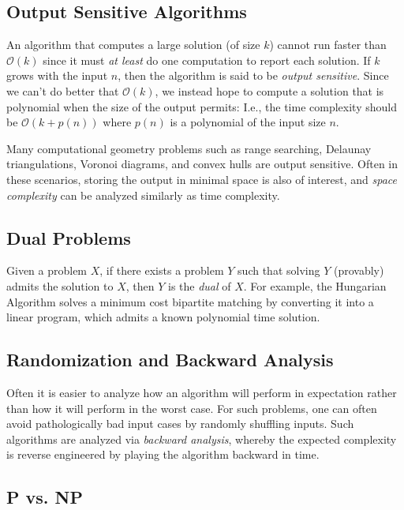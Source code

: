 \documentclass[12pt]{article}
\begin{document}
\subsection*{Output Sensitive Algorithms}

An algorithm that computes a large solution (of size $k$) cannot run faster
than $\mathcal{O}(k)$ since it must {\it at least} do one computation to
report each solution.
If $k$ grows with the input $n$, then the algorithm is said to be 
{\it output sensitive}.
Since we can't do better that $\mathcal{O}(k)$, we instead hope to compute
a solution that is polynomial when the size of the output permits: 
I.e., the time complexity should be $\mathcal{O}\left(k + p(n)\right)$ where 
$p(n)$ is a polynomial of the input size $n$.

Many computational geometry problems such as range searching, 
Delaunay triangulations, Voronoi diagrams, and convex hulls are
output sensitive.
Often in these scenarios, storing the output in minimal space is also
of interest, and {\it space complexity} can be analyzed similarly as time
complexity.

\subsection*{Dual Problems}

Given a problem $X$, if there exists a problem $Y$ such that solving
$Y$ (provably) admits the solution to $X$, then $Y$ is the {\it dual}
of $X$.
For example, the Hungarian Algorithm solves a minimum cost
bipartite matching by converting it into a linear program, which
admits a known polynomial time solution.

\subsection*{Randomization and Backward Analysis}

Often it is easier to analyze how an algorithm will perform in expectation
rather than how it will perform in the worst case.
For such problems, one can often avoid pathologically bad input cases by
randomly shuffling inputs.
Such algorithms are analyzed via {\it backward analysis}, whereby the
expected complexity is reverse engineered by playing the algorithm backward
in time.

\subsection*{P vs. NP}
\end{document}
